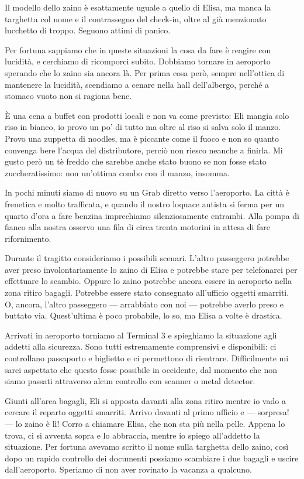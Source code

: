 Il modello dello zaino è esattamente uguale a quello di Elisa, ma manca la targhetta col nome e il contrassegno del check-in, oltre al già menzionato lucchetto di troppo. Seguono attimi di panico.

Per fortuna sappiamo che in queste situazioni la cosa da fare è reagire con lucidità, e cerchiamo di ricomporci subito. Dobbiamo tornare in aeroporto sperando che lo zaino sia ancora là. Per prima cosa però, sempre nell'ottica di mantenere la lucidità, scendiamo a cenare nella hall dell'albergo, perché a stomaco vuoto non si ragiona bene.

È una cena a buffet con prodotti locali e non va come previsto: Eli mangia solo riso in bianco, io provo un po' di tutto ma oltre al riso si salva solo il manzo. Provo una zuppetta di noodles, ma è piccante come il fuoco e non so quanto convenga bere l'acqua del distributore, perciò non riesco neanche a finirla. Mi gusto però un tè freddo che sarebbe anche stato buono se non fosse stato zuccheratissimo: non un'ottima combo con il manzo, insomma.

In pochi minuti siamo di nuovo su un Grab diretto verso l'aeroporto. La città è frenetica e molto trafficata, e quando il nostro loquace autista si ferma per un quarto d'ora a fare benzina imprechiamo silenziosamente entrambi. Alla pompa di fianco alla nostra osservo una fila di circa trenta motorini in attesa di fare rifornimento.

Durante il tragitto consideriamo i possibili scenari. L'altro passeggero potrebbe aver preso involontariamente lo zaino di Elisa e potrebbe stare per telefonarci per effettuare lo scambio. Oppure lo zaino potrebbe ancora essere in aeroporto nella zona ritiro bagagli. Potrebbe essere stato consegnato all'ufficio oggetti smarriti. O, ancora, l'altro passeggero — arrabbiato con noi — potrebbe averlo preso e buttato via. Quest'ultima è poco probabile, lo so, ma Elisa a volte è drastica.

Arrivati in aeroporto torniamo al Terminal 3 e spieghiamo la situazione agli addetti alla sicurezza. Sono tutti estremamente comprensivi e disponibili: ci controllano passaporto e biglietto e ci permettono di rientrare. Difficilmente mi sarei aspettato che questo fosse possibile in occidente, dal momento che non siamo passati attraverso alcun controllo con scanner o metal detector.

Giunti all'area bagagli, Eli si apposta davanti alla zona ritiro mentre io vado a cercare il reparto oggetti smarriti. Arrivo davanti al primo ufficio e — sorpresa! — lo zaino è lì! Corro a chiamare Elisa, che non sta più nella pelle. Appena lo trova, ci si avventa sopra e lo abbraccia, mentre io spiego all'addetto la situazione. Per fortuna avevamo scritto il nome sulla targhetta dello zaino, così dopo un rapido controllo dei documenti possiamo scambiare i due bagagli e uscire dall'aeroporto. Speriamo di non aver rovinato la vacanza a qualcuno.


